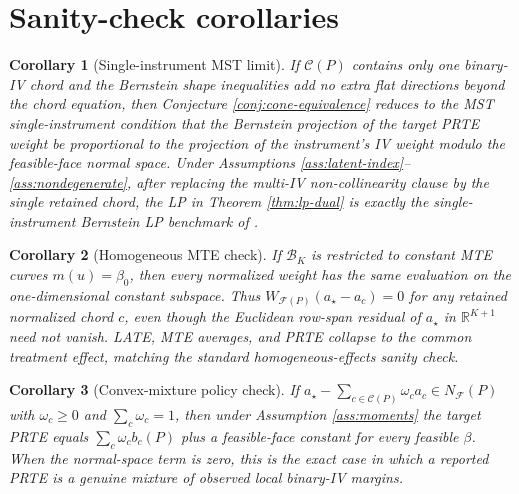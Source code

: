 \documentclass[11pt]{article}
\theoremstyle{definition}
\theoremstyle{plain}
\newtheorem{corollary}{Corollary}
\theoremstyle{remark}
\begin{document}
\section{Sanity-check corollaries}
\begin{corollary}[Single-instrument MST limit]\label{cor:mst-limit}
If \(\mathcal C(P)\) contains only one binary-IV chord and the Bernstein shape inequalities add no extra flat directions beyond the chord equation, then Conjecture \ref{conj:cone-equivalence} reduces to the MST single-instrument condition that the Bernstein projection of the target PRTE weight be proportional to the projection of the instrument's IV weight modulo the feasible-face normal space. Under Assumptions \ref{ass:latent-index}--\ref{ass:nondegenerate}, after replacing the multi-IV non-collinearity clause by the single retained chord, the LP in Theorem \ref{thm:lp-dual} is exactly the single-instrument Bernstein LP benchmark of \citet{MogstadSantosTorgovitsky2018}.
\end{corollary}

\begin{corollary}[Homogeneous MTE check]\label{cor:homogeneous}
If \(\mathcal B_K\) is restricted to constant MTE curves \(m(u)=\beta_0\), then every normalized weight has the same evaluation on the one-dimensional constant subspace. Thus \(W_{\mathcal F(P)}(a_\star-a_c)=0\) for any retained normalized chord \(c\), even though the Euclidean row-span residual of \(a_\star\) in \(\mathbb R^{K+1}\) need not vanish. LATE, MTE averages, and PRTE collapse to the common treatment effect, matching the standard homogeneous-effects sanity check.
\end{corollary}

\begin{corollary}[Convex-mixture policy check]\label{cor:mixture}
If \(a_\star-\sum_{c\in\mathcal C(P)}\omega_c a_c\in N_{\mathcal F}(P)\) with \(\omega_c\geq0\) and \(\sum_c\omega_c=1\), then under Assumption \ref{ass:moments} the target PRTE equals \(\sum_c\omega_c b_c(P)\) plus a feasible-face constant for every feasible \(\beta\). When the normal-space term is zero, this is the exact case in which a reported PRTE is a genuine mixture of observed local binary-IV margins.
\end{corollary}
\end{document}
